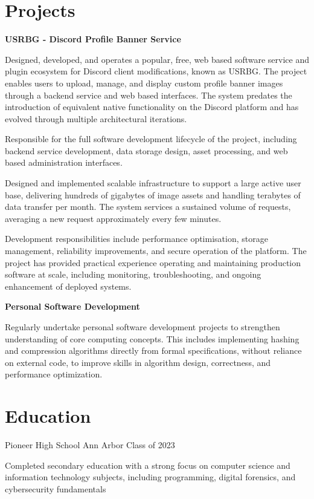 \documentclass{../styles/cv}
\begin{document}
\section{Projects}

\textbf{USRBG - Discord Profile Banner Service}
\resumesublistbegin
    \item Designed, developed, and operates a popular, free, web based software service and plugin ecosystem for Discord client modifications, known as USRBG. The project enables users to upload, manage, and display custom profile banner images through a backend service and web based interfaces. The system predates the introduction of equivalent native functionality on the Discord platform and has evolved through multiple architectural iterations.
    \item Responsible for the full software development lifecycle of the project, including backend service development, data storage design, asset processing, and web based administration interfaces.
    \item Designed and implemented scalable infrastructure to support a large active user base, delivering hundreds of gigabytes of image assets and handling terabytes of data transfer per month. The system services a sustained volume of requests, averaging a new request approximately every few minutes.
    \item Development responsibilities include performance optimisation, storage management, reliability improvements, and secure operation of the platform. The project has provided practical experience operating and maintaining production software at scale, including monitoring, troubleshooting, and ongoing enhancement of deployed systems.
\resumesublistend

\textbf{Personal Software Development}
\resumesublistbegin
    \item Regularly undertake personal software development projects to strengthen understanding of core computing concepts. This includes implementing hashing and compression algorithms directly from formal specifications, without reliance on external code, to improve skills in algorithm design, correctness, and performance optimization.
\resumesublistend

\section{Education}

\subsectionpositiondate
    {Pioneer High School}
    {Ann Arbor}
    {Class of 2023}
\resumesublistbegin
    \item Completed secondary education with a strong focus on computer science and information technology subjects, including programming, digital forensics, and cybersecurity fundamentals
\resumesublistend
\end{document}
